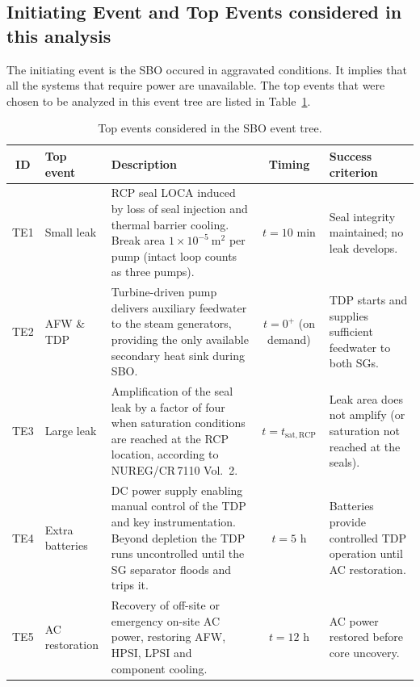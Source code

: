 \documentclass[a4paper,11pt]{article}
\numberwithin{subsubsection}{subsection}
\numberwithin{subsection}{section}
\newcommand{\tabref}[1]{Table~\ref{#1}}
\begin{document}
\subsection{Initiating Event and Top Events considered in this analysis}

The initiating event is the SBO occured in aggravated conditions. It implies that all the systems that require power are unavailable. The top events that were chosen to be analyzed in this event tree are listed in \tabref{TOPEVENTS}. 

\begin{table}[H]
\centering
\caption{Top events considered in the SBO event tree.}
\label{tab:top_events}
\renewcommand{\arraystretch}{1.25}
\begin{tabular}{@{}cl>{\raggedright\arraybackslash}p{4.6cm}c>{\raggedright\arraybackslash}p{3.6cm}@{}}
\toprule
\textbf{ID} & \textbf{Top event} & \textbf{Description} & \textbf{Timing} & \textbf{Success criterion} \\
\midrule
TE1 & Small leak &
RCP seal LOCA induced by loss of seal injection and thermal barrier cooling. Break area $1\times 10^{-5}\ \mathrm{m^2}$ per pump (intact loop counts as three pumps). &
$t = 10$ min &
Seal integrity maintained; no leak develops. \\

TE2 & AFW \& TDP &
Turbine-driven pump delivers auxiliary feedwater to the steam generators, providing the only available secondary heat sink during SBO. &
$t = 0^{+}$ (on demand) &
TDP starts and supplies sufficient feedwater to both SGs. \\

TE3 & Large leak &
Amplification of the seal leak by a factor of four when saturation conditions are reached at the RCP location, according to NUREG/CR\,7110 Vol.~2. &
$t = t_{\mathrm{sat,RCP}}$ &
Leak area does not amplify (or saturation not reached at the seals). \\

TE4 & Extra batteries &
DC power supply enabling manual control of the TDP and key instrumentation. Beyond depletion the TDP runs uncontrolled until the SG separator floods and trips it. &
$t = 5$ h &
Batteries provide controlled TDP operation until AC restoration. \\

TE5 & AC restoration &
Recovery of off-site or emergency on-site AC power, restoring AFW, HPSI, LPSI and component cooling. &
$t = 12$ h &
AC power restored before core uncovery. \\
\bottomrule
\end{tabular}
\label{TOPEVENTS}
\end{table}
\end{document}
